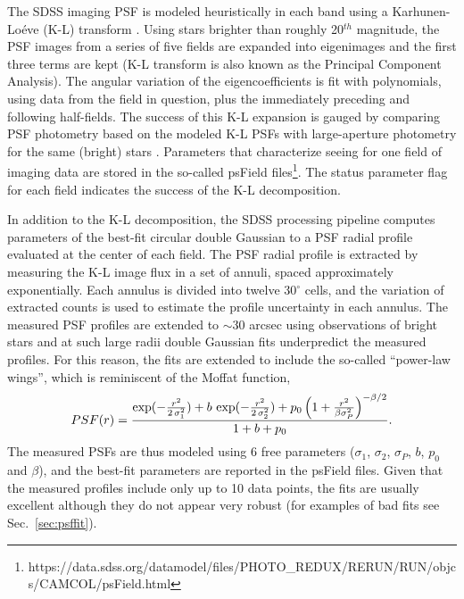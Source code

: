 The SDSS imaging PSF is modeled 
heuristically in each band using a Karhunen-Lo\'{e}ve (K-L) transform \citep{Lupton2002}. 
Using stars brighter than roughly 20$^{th}$ magnitude, the PSF images from a series of five 
fields are expanded into eigenimages and the first three terms are kept (K-L transform is 
also known as the Principal Component Analysis). The angular variation of the eigencoefficients
is fit with polynomials, using data from the field in question, plus the immediately preceding 
and following half-fields. The success of this K-L expansion is gauged by comparing PSF 
photometry based on the modeled K-L PSFs with large-aperture photometry for the same 
(bright) stars \citep{SDSSEDR}. 
Parameters that characterize seeing for one field of imaging data are stored in the so-called psField 
files\footnote{https://data.sdss.org/datamodel/files/PHOTO\_REDUX/RERUN/RUN/objcs/CAMCOL/psField.html}. 
The status parameter flag for each field indicates the success of the K-L decomposition.

In addition to the K-L decomposition, the SDSS processing pipeline computes parameters of the 
best-fit circular double Gaussian to a PSF radial profile evaluated at the center of each field. 
The PSF radial profile is extracted by measuring the K-L image flux in a set of annuli, spaced 
approximately exponentially. Each annulus is divided into twelve 30$^\circ$ cells, and the 
variation of extracted counts is used to estimate the profile uncertainty in each annulus.  
The measured PSF profiles are extended to $\sim$30 arcsec using observations of bright stars 
and at such large radii double Gaussian fits underpredict the measured profiles. For this reason, 
the fits are extended to include the so-called ``power-law wings'', which is reminiscent of
the Moffat function,
\begin{equation}
\label{eq:SDSSPSF}
        PSF(r) = {\exp(-{r^2\over 2\,\sigma_1^2}) + b\,\exp(-{r^2\over 2\,\sigma_2^2})
           + p_0\left(1 + { r^2 \over \beta \sigma_P^2}\right)^{-\beta/2} \over 1 + b + p_0}.
\end{equation} 
The measured PSFs are thus modeled using 6 free parameters ($\sigma_1$, $\sigma_2$, $\sigma_P$,
$b$, $p_0$ and $\beta$), and the best-fit parameters are reported in the psField files. 
Given that the measured profiles include only up to 10 data points, the fits are usually excellent
although they do not appear very robust (for examples of bad fits see Sec.~\ref{sec:psffit}).

